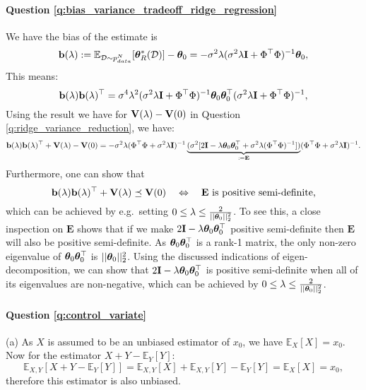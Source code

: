 \paragraph{Question \ref{q:bias_variance_tradeoff_ridge_regression}}
We have the bias of the estimate is
\begin{equation*}
\mathbf{b}(\lambda) := \mathbb{E}_{\mathcal{D} \sim p_{data}^N}[\bm{\theta}^*_R(\mathcal{D})] - \bm{\theta}_0 = -\sigma^2 \lambda ( \sigma^2 \lambda \mathbf{I} + \Phi^\top \Phi )^{-1} \bm{\theta}_0,
\end{equation*}
This means:
\begin{equation*}
\mathbf{b}(\lambda) \mathbf{b}(\lambda)^\top = \sigma^4 \lambda^2 ( \sigma^2 \lambda \mathbf{I} + \Phi^\top \Phi )^{-1} \bm{\theta}_0 \bm{\theta}_0^\top ( \sigma^2 \lambda \mathbf{I} + \Phi^\top \Phi )^{-1},
\end{equation*}
Using the result we have for $\mathbf V(\lambda) - \mathbf V(0)$ in Question \ref{q:ridge_variance_reduction}, we have:
\begin{equation*}
\mathbf{b}(\lambda) \mathbf{b}(\lambda)^\top + \mathbf V(\lambda) - \mathbf V(0) = -\sigma^2 \lambda (\Phi^\top \Phi + \sigma^2 \lambda \mathbf{I})^{-1} \underbrace{(\sigma^2 [ 2 \mathbf{I} - \lambda \bm{\theta}_0 \bm{\theta}_0^\top + \sigma^2 \lambda (\Phi^\top \Phi)^{-1}] )}_{:= \mathbf{E}} (\Phi^\top \Phi + \sigma^2 \lambda \mathbf{I})^{-1}.
\end{equation*} 
Furthermore, one can show that
\begin{equation*}
\mathbf{b}(\lambda) \mathbf{b}(\lambda)^\top + \mathbf V(\lambda) \preceq \mathbf V(0) \quad \Leftrightarrow \quad \mathbf{E} \text{ is positive semi-definite,}
\end{equation*}
which can be achieved by e.g.~setting $0 \leq \lambda \leq \frac{2}{|| \bm{\theta}_0 ||_2^2}$. To see this, a close inspection on $\mathbf{E}$ shows that if we make $2 \mathbf{I} - \lambda \bm{\theta}_0 \bm{\theta}_0^\top$ positive semi-definite then $\mathbf{E}$ will also be positive semi-definite. As $\bm{\theta}_0 \bm{\theta}_0^\top$ is a rank-1 matrix, the only non-zero eigenvalue of $\bm{\theta}_0 \bm{\theta}_0^\top$ is $|| \bm{\theta}_0 ||_2^2$. Using the discussed indications of eigen-decomposition, we can show that $2 \mathbf{I} - \lambda \bm{\theta}_0 \bm{\theta}_0^\top$ is positive semi-definite when all of its eigenvalues are non-negative, which can be achieved by $0 \leq \lambda \leq \frac{2}{|| \bm{\theta}_0 ||_2^2}$.

\paragraph{Question \ref{q:control_variate}}
(a) As $X$ is assumed to be an unbiased estimator of $x_0$, we have $\mathbb{E}_X[X] = x_0$. Now for the estimator $X + Y - \mathbb{E}_Y[Y]$:
$$\mathbb{E}_{X, Y}[ X + Y - \mathbb{E}_Y[Y] ] = \mathbb{E}_{X, Y}[X] + \mathbb{E}_{X, Y}[Y] - \mathbb{E}_Y[Y] = \mathbb{E}_{X}[X] = x_0,$$
therefore this estimator is also unbiased. 

